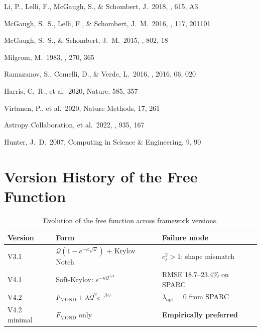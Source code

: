 \documentclass{aa}
\newcommand{\Q}{\mathcal{Q}}
\newcommand{\Fmond}{F_\text{MOND}}
\newcommand{\cs}{c_s^2}
\newcommand{\lopt}{\lambda_\text{opt}}
\begin{document}
\begin{thebibliography}{}
  Li, P., Lelli, F., McGaugh, S., \& Schombert, J.\ 2018, \aap, 615, A3

  McGaugh, S.~S., Lelli, F., \& Schombert, J.~M.\ 2016, \prl, 117, 201101

  McGaugh, S.~S., \& Schombert, J.~M.\ 2015, \apj, 802, 18

  Milgrom, M.\ 1983, \apj, 270, 365

  Ramazanov, S., Comelli, D., \& Verde, L.\ 2016, \jcap, 2016, 06, 020

  Harris, C.~R., et al.\ 2020, Nature, 585, 357

  Virtanen, P., et al.\ 2020, Nature Methods, 17, 261

  Astropy Collaboration, et al.\ 2022, \apj, 935, 167

  Hunter, J.~D.\ 2007, Computing in Science \& Engineering, 9, 90

\end{thebibliography}

\appendix

\section{Version History of the Free Function}
\label{app:versions}

\begin{table}
  \caption{Evolution of the free function across framework versions.}
  \centering
  \begin{tabular}{lll}
    \hline\hline
    Version & Form & Failure mode \\
    \hline
    V3.1     &
      $\Q(1 - e^{-\kappa\sqrt{\Q}})$ + Krylov Notch &
      $\cs > 1$; shape mismatch \\
    V4.1     &
      Soft-Krylov: $e^{-\kappa\Q^{1/4}}$ &
      RMSE 18.7--23.4\% on SPARC \\
    V4.2     &
      $\Fmond + \lambda\Q^2 e^{-\beta\Q}$ &
      $\lopt = 0$ from SPARC \\
    V4.2 minimal &
      $\Fmond$ only &
      \textbf{Empirically preferred} \\
    \hline
  \end{tabular}
  \label{tab:versions}
\end{table}
\end{document}
